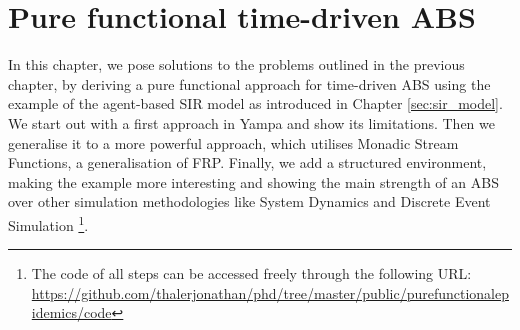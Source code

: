 \chapter{Pure functional time-driven ABS}
\label{ch:timedriven}

In this chapter, we pose solutions to the problems outlined in the previous chapter, by deriving a pure functional approach for time-driven ABS using the example of the agent-based SIR model as introduced in Chapter \ref{sec:sir_model}. We start out with a first approach in Yampa and show its limitations. Then we generalise it to a more powerful approach, which utilises Monadic Stream Functions, a generalisation of FRP. Finally, we add a structured environment, making the example more interesting and showing the main strength of an ABS over other simulation methodologies like System Dynamics and Discrete Event Simulation \footnote{The code of all steps can be accessed freely through the following URL: \url{https://github.com/thalerjonathan/phd/tree/master/public/purefunctionalepidemics/code}}.







